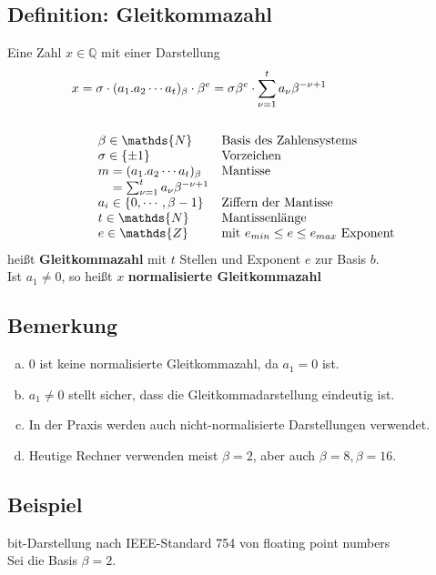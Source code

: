\documentclass[ngerman,fontsize=11pt, paper=a4, parskip=half, titlepage=true, toc=bib]{scrbook}
\newcommand{\Q}{\mathds{Q}}
\newcommand{\N}{\mathds{N}}
\newcommand{\Z}{\mathds{Z}}
\begin{document}
\subsection{Definition: Gleitkommazahl} \label{3.1.1} 
Eine Zahl $x\in\Q$ mit einer Darstellung
\begin{align*}
  x&=\sigma \cdot(a_1 . a_2 \cdots a_t)_{\beta}\cdot \beta^e 
     = \sigma\beta^e \cdot \sum_{\nu=1}^{t}a_\nu \beta^{-\nu+1}\\\\
   &\quad\begin{array}{ll}
           \beta\in\N & \text{Basis des Zahlensystems}\index{Basis}\\
           \sigma \in\{\pm 1\} &\text{Vorzeichen} \\
           m = (a_1 . a_2 \cdots a_t)_{\beta} &\text{Mantisse}\index{Mantisse}\\
           \phantom{m}= \sum_{\nu=1}^{t}a_\nu \beta^{-\nu+1} \\
           a_i \in\{0,\cdots , \beta-1\}&\text{Ziffern der Mantisse}\\
           t\in\N&\text{Mantissenlänge} \\
           e\in\Z &\text{mit }e_{min}\leq e \leq e_{max} \text{ Exponent}
         \end{array}
\end{align*}
heißt \textbf{Gleitkommazahl} mit $t$ Stellen und Exponent $e$ zur Basis $b$. \\
Ist $a_1\neq 0$, so heißt $x$ \textbf{normalisierte Gleitkommazahl}

\subsection{Bemerkung} \label{3.1.2}
\begin{enumerate}[a)]
\item 0 ist keine normalisierte Gleitkommazahl, da $a_1 =  0$ ist.
\item $a_1\neq 0$ stellt sicher, dass die Gleitkommadarstellung eindeutig ist.
\item In der Praxis werden auch nicht-normalisierte Darstellungen verwendet.
\item Heutige Rechner verwenden meist $\beta =2$, aber auch $\beta=8, \beta=16$.
\end{enumerate}

\subsection{Beispiel} \label{3.1.3}
bit-Darstellung nach IEEE-Standard 754 von floating point numbers \\
Sei die Basis $\beta=2$.
\end{document}
